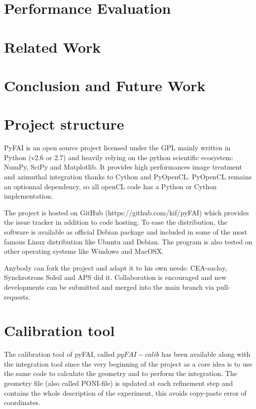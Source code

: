 \documentclass[preprint]{iucr}
\begin{document}
\section{Performance Evaluation} 
\section{Related Work}
\section{Conclusion and Future Work}







\appendix
\section{Project structure}
PyFAI is an open source project licensed under the GPL mainly written in Python (v2.6 or 2.7)
and heavily relying on the python scientific ecosystem: NumPy\cite{numpy},
SciPy\cite{scipy} and Matplotlib\cite{matplotlib}.
It provides high performances image treatment and azimuthal integration thanks
to Cython\cite{cython} and PyOpenCL\cite{pyopencl}. PyOpenCL remains an
optionnal dependency, so all openCL\cite{opencl} code has a Python or Cython
implementation.

The project is hosted on GitHub (https://github.com/kif/pyFAI) which provides
the issue tracker in addition to code hosting.
To ease the distribution, the
software is available as official Debian package and included in some of the
most famous Linux distribution like Ubuntu and Debian.
The program is also tested on other operating systems like Windows and
MacOSX.

Anybody can fork the project and adapt it to his own needs: CEA-saclay,
Synchrotrons Soleil and APS did it. Collaboration is encouraged and 
new developments can be submitted and merged into the main branch
via pull-requests.

\section{Calibration tool}
\label{annex_calib}

The calibration tool of pyFAI, called $pyFAI-calib$ has been available along
with the integration tool since the very beginning of the project as a core idea
is to use the same code to calculate the geometry and to perform the integration.
The geometry file (also called PONI-file) is updated at each refinement step and
contains the whole description of the experiment, this avoids copy-paste 
error of coordinates.
\end{document}
